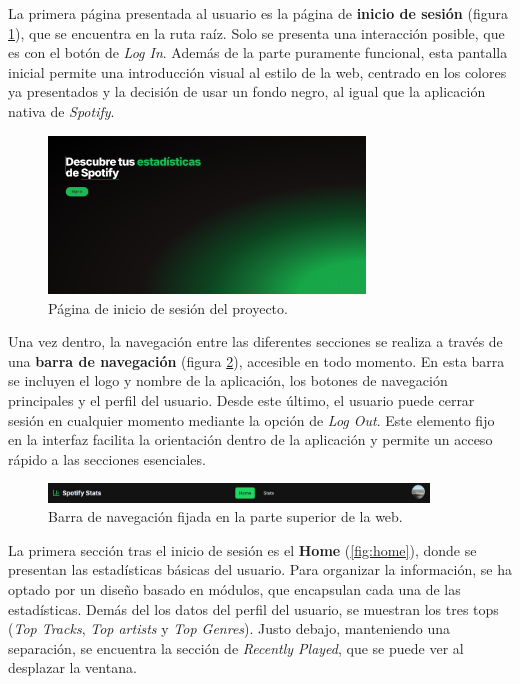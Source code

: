 La primera página presentada al usuario es la página de \textbf{inicio de sesión} (figura \ref{fig:login}), que se encuentra en la ruta raíz. Solo se presenta una interacción posible, que es con el botón de \textit{Log In}. Además de la parte puramente funcional, esta pantalla inicial permite una introducción visual al estilo de la web, centrado en los colores ya presentados y la decisión de usar un fondo negro, al igual que la aplicación nativa de \textit{Spotify}.

\begin{figure}[H]
    \centering
    \includegraphics[width=0.75\textwidth]{figures/capturas_ui/login.png}
    \caption{Página de inicio de sesión del proyecto.}
    \label{fig:login}
\end{figure}

Una vez dentro, la navegación entre las diferentes secciones se realiza a través de una \textbf{barra de navegación} (figura \ref{fig:navbar}), accesible en todo momento. En esta barra se incluyen el logo y nombre de la aplicación, los botones de navegación principales y el perfil del usuario. Desde este último, el usuario puede cerrar sesión en cualquier momento mediante la opción de \textit{Log Out}. Este elemento fijo en la interfaz facilita la orientación dentro de la aplicación y permite un acceso rápido a las secciones esenciales.

\begin{figure}[H]
    \centering
    \includegraphics[width=0.9\textwidth]{figures/capturas_ui/navbar.png}
    \caption{Barra de navegación fijada en la parte superior de la web.}
    \label{fig:navbar}
\end{figure}

La primera sección tras el inicio de sesión es el \textbf{Home} (\ref{fig:home}), donde se presentan las estadísticas básicas del usuario. Para organizar la información, se ha optado por un diseño basado en módulos, que encapsulan cada una de las estadísticas. Demás del los datos del perfil del usuario, se muestran los tres tops (\textit{Top Tracks}, \textit{Top artists} y  \textit{Top Genres}). Justo debajo, manteniendo una separación, se encuentra la sección de \textit{Recently Played}, que se puede ver al desplazar la ventana.

